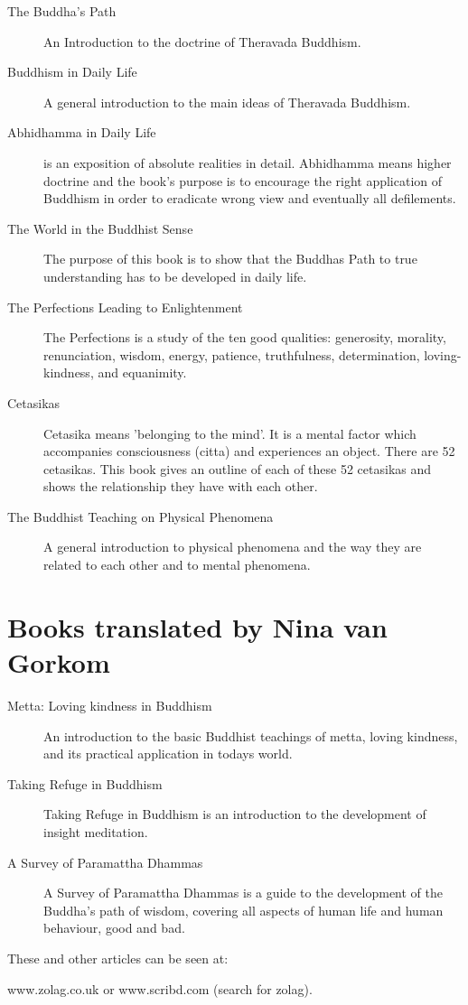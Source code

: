 \documentclass{book}
\begin{document}
\begin{description}
\item[The Buddha's Path] An Introduction to the doctrine of Theravada Buddhism.
\item[Buddhism in Daily Life] A general introduction to the main ideas of Theravada Buddhism.
\item[Abhidhamma in Daily Life] is an exposition of absolute realities in detail. Abhidhamma means higher doctrine and the book's purpose is to encourage the right application of Buddhism in order to eradicate wrong view and eventually all defilements.

\item[The World in the Buddhist Sense] The purpose of this book is to show that the Buddhas Path to true understanding has to be developed in daily life.

\item[The Perfections Leading to Enlightenment] The Perfections is a study of the ten good qualities: generosity, morality, renunciation, wisdom, energy, patience, truthfulness, determination, loving-kindness, and equanimity.






\item[Cetasikas] Cetasika means 'belonging to the mind'. It is a mental factor which accompanies consciousness (citta) and experiences an object. There are 52 cetasikas. This book gives an outline of each of these 52 cetasikas and shows the relationship they have with each other.


\item[The Buddhist Teaching on Physical Phenomena] A general introduction to physical phenomena and the way they are
related to each other and to mental phenomena.\end{description}

\section*{Books translated by Nina van Gorkom}

\begin{description}

\item[Metta: Loving kindness in Buddhism] An introduction to the basic Buddhist teachings of metta, loving kindness, and its practical application in todays world. 


\item[Taking Refuge in Buddhism] Taking Refuge in Buddhism is an introduction to the development of insight meditation. 

\item[A Survey of Paramattha Dhammas] A Survey of Paramattha Dhammas is a guide to the development of the Buddha's path of wisdom, covering all aspects of human life and human behaviour, good and bad.
\end{description}



These and other articles can be seen at:

www.zolag.co.uk or www.scribd.com (search for zolag).
\end{document}
